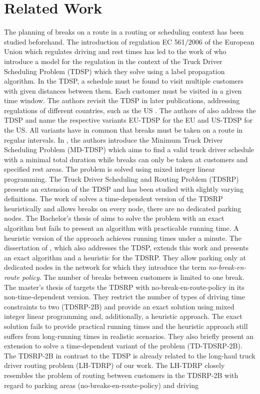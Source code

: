 
\chapter{Related Work\label{ch:related_work}}
The planning of breaks on a route in a routing or scheduling context has been studied beforehand. The introduction of regulation EC 561/2006 of the European Union \cite{europeanparliament:2006} which regulates driving and rest times has led to the work of \cite{goel:2009a} who introduce a model for the regulation in the context of the Truck Driver Scheduling Problem (TDSP) which they solve using a label propagation algorithm. In the TDSP, a schedule must be found to visit multiple customers with given distances between them. Each customer must be visited in a given time window. The authors revisit the TDSP in later publications, addressing regulations of different countries, such as the US \cite{goel:2012c}. The authors of \cite{sartori:2022} also address the TDSP and name the respective variants EU-TDSP for the EU and US-TDSP for the US. All variants have in common that breaks must be taken on a route in regular intervals. In \cite{goel:2012b}, the authors introduce the Minimum Truck Driver Scheduling Problem (MD-TDSP) which aims to find a valid truck driver schedule with a minimal total duration while breaks can only be taken at customers and specified rest areas. The problem is solved using mixed integer linear programming. The Truck Driver Scheduling and Routing Problem (TDSRP) presents an extension of the TDSP and has been studied with slightly varying definitions. The work of \cite{shah:2008} solves a time-dependent version of the TDSRP heuristically and allows breaks on every node, there are no dedicated parking nodes. The Bachelor's thesis of \cite{braeuer:2016} aims to solve the problem with an exact algorithm but fails to present an algorithm with practicable running time. A heuristic version of the approach achieves running times under a minute. The dissertation of \cite{kleff:2019}, which also addresses the TDSP, extends this work and presents an exact algorithm and a heuristic for the TDSRP. They allow parking only at dedicated nodes in the network for which they introduce the term \emph{no-break-en-route policy}. The number of breaks between customers is limited to one break. The master's thesis of \cite{bomsdorf:2020} targets the TDSRP with no-break-en-route-policy in its non-time-dependent version. They restrict the number of types of driving time constraints to two (TDSRP-2B) and provide an exact solution using mixed integer linear programming and, additionally, a heuristic approach. The exact solution fails to provide practical running times and the heuristic approach still suffers from long-running times in realistic scenarios. They also briefly present an extension to solve a time-dependent variant of the problem (TD-TDSRP-2B). The TDSRP-2B in contrast to the TDSP is already related to the long-haul truck driver routing problem (LH-TDRP) of our work. The LH-TDRP closely resembles the problem of routing between customers in the TDSRP-2B with regard to parking areas (no-breaks-en-route-policy) and driving 